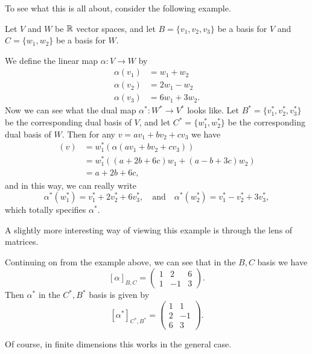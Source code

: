 \documentclass[a4paper]{scrartcl}
\begin{document}
To see what this is all about, consider the following example.

\begin{example}
Let $V$ and $W$ be $\mathbb{R}$ vector spaces, and let $B = \{v_1, v_2, v_3\}$ be a basis for $V$ and $C = \{w_1, w_2\}$ be a basis for $W$.

We define the linear map $\alpha: V \rightarrow W$ by
\begin{align*}
    \alpha(v_1) &= w_1 + w_2 \\
    \alpha(v_2) &= 2w_1 - w_2 \\
    \alpha(v_3) &= 6w_1 + 3w_2.
\end{align*}
Now we can see what the dual map $\alpha^*: W^* \rightarrow V^*$ looks like. Let $B^* = \{v_1^*, v_2^*, v_3^*\}$ be the corresponding dual basis of $V$, and let $C^* = \{w_1^*, w_2^*\}$ be the corresponding dual basis of $W$. Then for any $v = av_1 + bv_2 + cv_3$ we have
\begin{align*}
    [\alpha^*(w_1^*)](v) &= w_1^*(\alpha(av_1 + bv_2 + cv_3)) \\
    &= w_1^*((a + 2b + 6c)w_1 + (a - b + 3c)w_2)\\
    &= a + 2b + 6c,
\end{align*}
and in this way, we can really write
$$
\alpha^*(w_1^*) = v_1^* +  2v_2^* + 6v_3^*, \quad \text{and} \quad \alpha^*(w_2^*) = v_1^* - v_2^* + 3v_3^*,
$$
which totally specifies $\alpha^*$.
\end{example}

A slightly more interesting way of viewing this example is through the lens of matrices.

\begin{example}
Continuing on from the example above, we can see that in the $B, C$ basis we have
$$
[\alpha]_{B, C} = \begin{pmatrix}
    1 & 2 & 6 \\
    1 & -1 & 3
\end{pmatrix}.
$$
Then $\alpha^*$ in the $C^*, B^*$ basis is given by
$$
[\alpha^*]_{C^*, B^*} = \begin{pmatrix}
    1 & 1 \\ 2 & -1 \\ 6 & 3
\end{pmatrix}.
$$
\end{example}

Of course, in finite dimensions this works in the general case.
\end{document}
